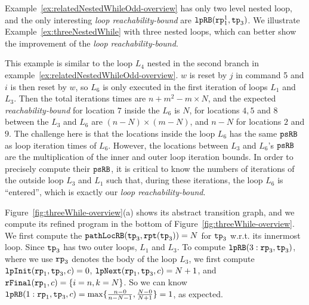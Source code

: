 Example~\ref{ex:relatedNestedWhileOdd-overview} has only two level nested loop, and
the only interesting \emph{loop reachability-bound} are $\mathtt{lpRB}(\mathtt{rp}_1^1, \mathtt{tp}_3)$.
We illustrate Example~\ref{ex:threeNestedWhile} with three nested loops, which can better show the improvement of the \emph{loop reachability-bound}.
\begin{example}
  \label{ex:threeNestedWhile}

This example is similar to the loop $L_4$ nested in the second branch in example~\ref{ex:relatedNestedWhileOdd-overview}.
$w$ is reset by $j$ in command 5 and $i$ is then reset by $w$, so $L_6$ is only executed in the first iteration of loops $L_1$ and $L_3$.
Then the total iterations times are
$n + m^2 - m \times N$,
and the expected \emph{reachability-bound} for location $7$ inside the $L_6$ is $N$,
for locations $4, 5$ and $8$ between the $L_3$ and $L_6$ are $(n-N) \times (m - N)$,
and $n - N$ for locations $2$ and $9$.
The challenge here is that the locations inside the loop $L_6$ has the same
$\mathtt{psRB}$ as loop iteration times of $L_6$.
However, the locations between $L_3$ and $L_6$'s $\mathtt{psRB}$ are the multiplication of the inner and outer loop iteration bounds.
In order to precisely compute their $\mathtt{psRB}$, it is critical to know
the numbers of iterations of the outside loop $L_3$ and $L_1$ such that,
during these iterations, the loop $L_6$ is ``entered'', which is exactly our \emph{loop reachability-bound}.

Figure~\ref{fig:threeWhile-overview}(a) shows its abstract transition graph,
and we compute its refined program in the bottom of Figure~\ref{fig:threeWhile-overview}. 
We first compute the $\mathtt{pathLocRB}(\mathtt{tp}_3, \mathtt{rpt}(\mathtt{tp}_3)) = N $ for $\mathtt{tp}_3$ w.r.t. its innermost loop.
Since $\mathtt{tp}_3$ has two outer loops, $L_1$ and $L_3$.
To compute $\mathtt{lpRB}(3: \mathtt{rp}_3, \mathtt{tp}_3)$, where we use $\mathtt{rp}_3$ denotes the body of the loop $L_3$,
we first compute $\mathtt{lpInit}( \mathtt{rp}_1, \mathtt{tp}_3, c) = 0$,
$\mathtt{lpNext}( \mathtt{rp}_1, \mathtt{tp}_3, c) =  N + 1 $, and
$\mathtt{rFinal}(\mathtt{rp}_1, c) = \{ i = n, k = N \}$.
So we can know $\mathtt{lpRB}(1: \mathtt{rp}_1, \mathtt{tp}_3, c) = \max\{ \frac{n - 0}{n - N - 1}, \frac{N - 0}{N +  1}\} = 1$, as expected.
\end{example}
